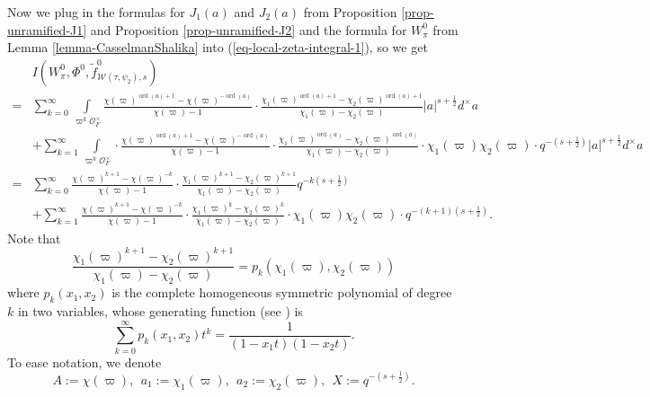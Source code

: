 \documentclass[11pt]{amsart}
\theoremstyle{definition}
\theoremstyle{remark}
\newcommand{\on}{\operatorname}
\newcommand{\ord}{\on{ord}}
\begin{document}
Now we plug in the formulas for $J_1(a)$ and $J_2(a)$ from Proposition \ref{prop-unramified-J1} and Proposition \ref{prop-unramified-J2} and the formula for $W_\pi^0$ from Lemma \ref{lemma-CasselmanShalika} into (\ref{eq-local-zeta-integral-1}), so we get
\begin{equation}
\begin{split}
&I(W_\pi^0, \Phi^0, \tilde{f}^0_{\mathcal{W}(\tau,\psi_2), s} )\\
  =&  \sum_{k=0}^\infty   \int\limits_{\varpi^k \mathcal{O}_F^\times}   \frac{\chi(\varpi)^{\ord(a)+1}-\chi(\varpi)^{-\ord(a)}}{\chi(\varpi)-1}  \cdot \frac{\chi_1(\varpi)^{\ord(a)+1}-\chi_2(\varpi)^{\ord(a)+1}}{\chi_1(\varpi)-\chi_2(\varpi)}    |a|^{s+\frac{1}{2}} d^\times a \\
  &  + \sum_{k=1}^\infty   \int\limits_{\varpi^k \mathcal{O}_F^\times}   \cdot \frac{\chi(\varpi)^{\ord(a)+1}-\chi(\varpi)^{-\ord(a)}}{\chi(\varpi)-1}  \cdot  \frac{\chi_1(\varpi)^{\ord(a)}-\chi_2(\varpi)^{\ord(a)}}{\chi_1(\varpi)-\chi_2(\varpi)}\cdot \chi_1(\varpi)\chi_2(\varpi) \cdot q^{-(s+\frac{1}{2})}   |a|^{s+\frac{1}{2}} d^\times a \\
  =&   \sum_{k=0}^\infty   \frac{\chi(\varpi)^{k+1}-\chi(\varpi)^{-k}}{\chi(\varpi)-1}  \cdot \frac{\chi_1(\varpi)^{k+1}-\chi_2(\varpi)^{k+1}}{\chi_1(\varpi)-\chi_2(\varpi)}    q^{-k(s+\frac{1}{2})} \\
  & +  \sum_{k=1}^\infty     \frac{\chi(\varpi)^{k+1}-\chi(\varpi)^{-k}}{\chi(\varpi)-1}  \cdot  \frac{\chi_1(\varpi)^{k}-\chi_2(\varpi)^{k}}{\chi_1(\varpi)-\chi_2(\varpi)}\cdot \chi_1(\varpi)\chi_2(\varpi) \cdot q^{-(k+1)(s+\frac{1}{2})}.  
\end{split}
\label{eq-local-zeta-integral2}
\end{equation}
Note that
\begin{equation*}
 \frac{\chi_1(\varpi)^{k+1}-\chi_2(\varpi)^{k+1}}{\chi_1(\varpi)-\chi_2(\varpi)} =p_k(\chi_1(\varpi), \chi_2(\varpi))
\end{equation*}
where $p_k(x_1, x_2)$ is the complete homogeneous symmetric polynomial of degree $k$ in two variables, whose generating function (see \cite[(2.5)]{Macdonald1995}) is
\begin{equation*}
\sum_{k=0}^\infty p_k(x_1, x_2)  t^k=  \frac{1}{(1-x_1 t)(1-x_2 t)}.
\end{equation*}
To ease notation, we denote
\begin{equation*}
A:=\chi(\varpi),  \ \ a_1:=\chi_1(\varpi),\ \  a_2:=\chi_2(\varpi),\ \  X:=q^{-(s+\frac{1}{2})}.
\end{equation*}
\end{document}
